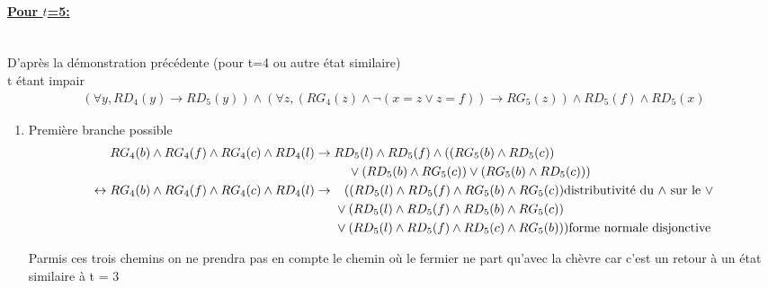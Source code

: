 \documentclass{article}
\begin{document}
\paragraph{\underline{Pour $t$=5:}}~~\\
D'après la démonstration précédente (pour t=4 ou autre état similaire)\\
t étant impair
\begin{align*}
    (\forall y, RD_{4}(y) \to RD_{5}(y)) \wedge (\forall z,(RG_{4}(z) \wedge \neg(x=z \vee z=f)) \rightarrow RG_5(z)) \wedge RD_5(f) \wedge RD_5(x)
\end{align*}
\begin{enumerate}
\item Première branche possible
  \begin{align*}
        RG_4(b) \wedge RG_4(f) \wedge RG_4(c) \wedge RD_4(l)&\to RD_5(l) \wedge RD_5(f) \wedge ((RG_5(b)\wedge RD_5(c))\\
        & \hphantom{aaaaa} \vee (RD_5(b)\wedge RG_5(c)) \vee(RG_5(b)\wedge RD_5(c)))\\
        \leftrightarrow RG_4(b) \wedge RG_4(f) \wedge RG_4(c) \wedge RD_4(l) &\to \hphantom{a|} (( RD_5(l) \wedge RD_5(f) \wedge RG_5(b) \wedge RG_5(c))\text{distributivité du $\wedge$ sur le $\vee$}\\
        & \hphantom{aaa} \vee (RD_5(l) \wedge RD_5(f) \wedge RD_5(b) \wedge RG_5(c))\\
        & \hphantom{aaa} \vee (RD_5(l) \wedge RD_5(f) \wedge RD_5(c) \wedge RG_5(b)))\text{forme normale disjonctive}\\
  \end{align*}


Parmis ces trois chemins on ne prendra pas en compte le chemin où le fermier ne part qu'avec la chèvre car c'est un retour à un état similaire à t = 3


\end{enumerate}
\end{document}
